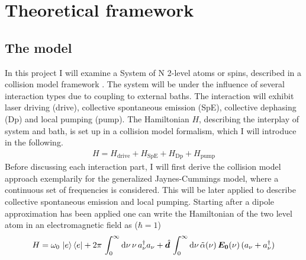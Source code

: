 

\chapter{Theoretical framework}\label{ch:theory}
\section{The model}
%
In this project I will examine a System of N 2-level atoms or spins, described in a collision model framework \cite{ciccarello_quantum_2022,gross_qubit_2018}. The system will be under the influence of several interaction types due to coupling to external baths. The interaction will exhibit laser driving (drive), collective spontaneous emission (SpE), collective dephasing (Dp) and local pumping (pump). The Hamiltonian $H$, describing the interplay of system and bath, is set up in a collision model formalism, which I will introduce in the following.
\begin{align}
    H = H_\text{drive}+H_\text{SpE}+H_\text{Dp}+H_\text{pump}
\end{align}
Before discussing each interaction part, I will first derive the collision model approach exemplarily for the generalized Jaynes-Cummings model, where a continuous set of frequencies is considered. This will be later applied to describe collective spontaneous emission and local pumping. Starting after a dipole approximation has been applied one can write the Hamiltonian of the two level atom in an electromagnetic field as ($\hbar=1$)
\begin{align*}
    H= {\omega_0}\,\ket{e}\bra{e}+2\pi\,\int_{0}^\infty\text{d}\nu\,\nu\,a^\dagger_\nu a_\nu+ \hat{\boldsymbol{d}}\,\int_{0}^\infty\text{d}\nu\,\tilde{\alpha}(\nu)\,\boldsymbol{E_0}(\nu)\,(a_\nu+a^\dagger_\nu)
\end{align*}
